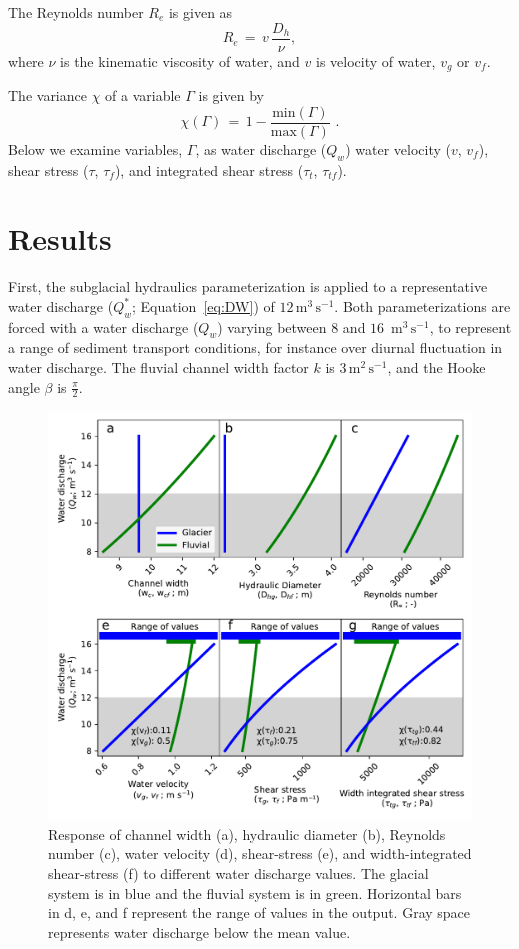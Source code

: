 \documentclass[11pt]{article}
\newcommand{\unit}[1]{$\mathrm{#1}$}
\begin{document}
\begin{spacing}{1}
  The Reynolds number $R_e$ is given as 
  \begin{equation}
    \label{eq:re}
    R_e\,=\, v \,\frac{D_h}{\nu},
  \end{equation}
  \noindent where $\nu$ is the kinematic viscosity of water, and  $v$ is velocity of water, $v_g$ or $v_f$.
  
  The variance $ \chi$ of a variable $\Gamma$ is given by 
  \begin{equation}
    \label{eq:var}
    \chi(\Gamma) \,=\, 1 - \frac{\mathrm{min}(\Gamma)}{\mathrm{max}(\Gamma)}\,\,.
  \end{equation}
  \noindent Below we examine variables, $\Gamma$, as water discharge ($Q_w$) water velocity ($v$, $v_f$), shear stress ($\tau$, $\tau_f$), and integrated shear stress ($\tau_t$, $\tau_{tf}$).
  
  
  \section{Results}
  First, the subglacial hydraulics parameterization is applied to a representative water discharge ($Q_w^*$; Equation~\ref{eq:DW}) of $12$\,\unit{m}$^{3}$\,\unit{s}$^{-1}$.
  Both parameterizations are forced with a water discharge ($Q_w$) varying between $8$ and $16$ \,\unit{m}$^{3}$\,\unit{s}$^{-1}$, to represent a range of sediment transport conditions, for instance over diurnal fluctuation in water discharge. The fluvial channel width factor $k$ is $3$\,\unit{m}$^{2}$\,\unit{s}$^{-1}$, and the Hooke angle $\beta$ is $\frac{\pi}{2}$.
  
  \begin{center}
    \begin{figure}[H]
      \includegraphics[width=0.7\linewidth]{model_outputs.pdf}
      \caption{Response of channel width (a), hydraulic diameter (b),  Reynolds number  (c),  water velocity (d), shear-stress (e), and width-integrated shear-stress (f)  to different water discharge values. The glacial system is in blue and the fluvial system is in green.  Horizontal bars in d, e, and f represent the range of values in the  output. Gray space represents water discharge below the mean value. }
      \label{fig:model_outs}
    \end{figure}
  \end{center}
  

\end{spacing}
\end{document}
